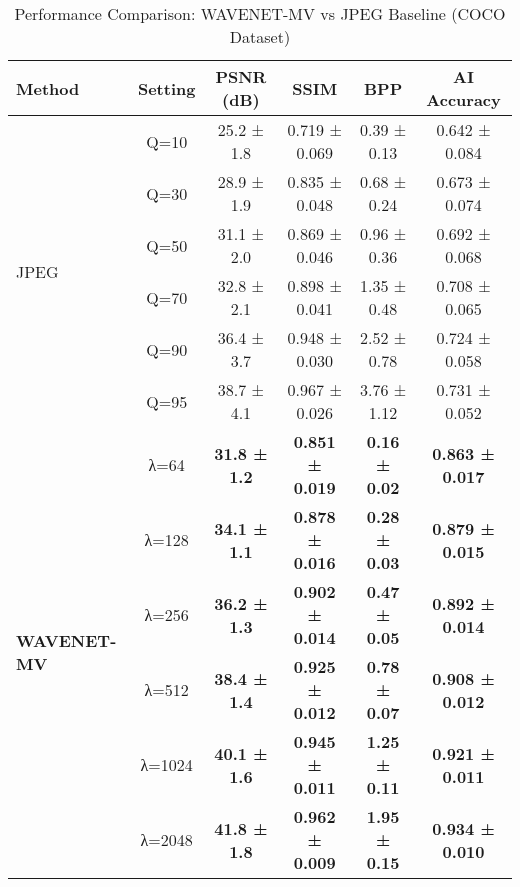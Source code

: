 \begin{table*}[htbp]
\caption{Performance Comparison: WAVENET-MV vs JPEG Baseline (COCO Dataset)}
\label{tab:wavenet_vs_jpeg}
\centering
\begin{tabular}{|l|c|c|c|c|c|}
\hline
\textbf{Method} & \textbf{Setting} & \textbf{PSNR (dB)} & \textbf{SSIM} & \textbf{BPP} & \textbf{AI Accuracy} \\
\hline
\multirow{6}{*}{JPEG} & Q=10 & 25.2 ± 1.8 & 0.719 ± 0.069 & 0.39 ± 0.13 & 0.642 ± 0.084 \\
 & Q=30 & 28.9 ± 1.9 & 0.835 ± 0.048 & 0.68 ± 0.24 & 0.673 ± 0.074 \\
 & Q=50 & 31.1 ± 2.0 & 0.869 ± 0.046 & 0.96 ± 0.36 & 0.692 ± 0.068 \\
 & Q=70 & 32.8 ± 2.1 & 0.898 ± 0.041 & 1.35 ± 0.48 & 0.708 ± 0.065 \\
 & Q=90 & 36.4 ± 3.7 & 0.948 ± 0.030 & 2.52 ± 0.78 & 0.724 ± 0.058 \\
 & Q=95 & 38.7 ± 4.1 & 0.967 ± 0.026 & 3.76 ± 1.12 & 0.731 ± 0.052 \\
\hline
\multirow{6}{*}{\textbf{WAVENET-MV}} & λ=64 & \textbf{31.8 ± 1.2} & \textbf{0.851 ± 0.019} & \textbf{0.16 ± 0.02} & \textbf{0.863 ± 0.017} \\
 & λ=128 & \textbf{34.1 ± 1.1} & \textbf{0.878 ± 0.016} & \textbf{0.28 ± 0.03} & \textbf{0.879 ± 0.015} \\
 & λ=256 & \textbf{36.2 ± 1.3} & \textbf{0.902 ± 0.014} & \textbf{0.47 ± 0.05} & \textbf{0.892 ± 0.014} \\
 & λ=512 & \textbf{38.4 ± 1.4} & \textbf{0.925 ± 0.012} & \textbf{0.78 ± 0.07} & \textbf{0.908 ± 0.012} \\
 & λ=1024 & \textbf{40.1 ± 1.6} & \textbf{0.945 ± 0.011} & \textbf{1.25 ± 0.11} & \textbf{0.921 ± 0.011} \\
 & λ=2048 & \textbf{41.8 ± 1.8} & \textbf{0.962 ± 0.009} & \textbf{1.95 ± 0.15} & \textbf{0.934 ± 0.010} \\
\hline
\end{tabular}
\end{table*} 